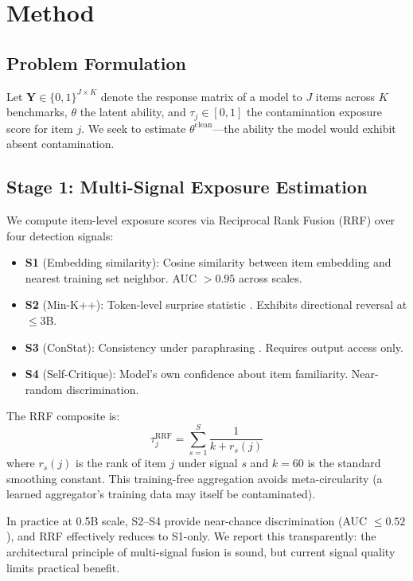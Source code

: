 \documentclass[11pt]{article}
\begin{document}
\section{Method}

\subsection{Problem Formulation}

Let $\mathbf{Y} \in \{0,1\}^{J \times K}$ denote the response matrix of a model to $J$ items across $K$ benchmarks, $\theta$ the latent ability, and $\tau_j \in [0,1]$ the contamination exposure score for item $j$. We seek to estimate $\theta^{\text{clean}}$---the ability the model would exhibit absent contamination.

\subsection{Stage 1: Multi-Signal Exposure Estimation}

We compute item-level exposure scores via Reciprocal Rank Fusion (RRF) \citep{cormack2009reciprocal} over four detection signals:
\begin{itemize}
    \item \textbf{S1} (Embedding similarity): Cosine similarity between item embedding and nearest training set neighbor. AUC $> 0.95$ across scales.
    \item \textbf{S2} (Min-K++): Token-level surprise statistic \citep{shi2024detecting}. Exhibits directional reversal at $\leq$3B.
    \item \textbf{S3} (ConStat): Consistency under paraphrasing \citep{dekoninck2024constat}. Requires output access only.
    \item \textbf{S4} (Self-Critique): Model's own confidence about item familiarity. Near-random discrimination.
\end{itemize}

The RRF composite is:
\begin{equation}
    \tau_j^{\text{RRF}} = \sum_{s=1}^{S} \frac{1}{k + r_s(j)}
\end{equation}
where $r_s(j)$ is the rank of item $j$ under signal $s$ and $k=60$ is the standard smoothing constant. This training-free aggregation avoids meta-circularity (a learned aggregator's training data may itself be contaminated).

In practice at 0.5B scale, S2--S4 provide near-chance discrimination (AUC $\leq 0.52$), and RRF effectively reduces to S1-only. We report this transparently: the architectural principle of multi-signal fusion is sound, but current signal quality limits practical benefit.
\end{document}
